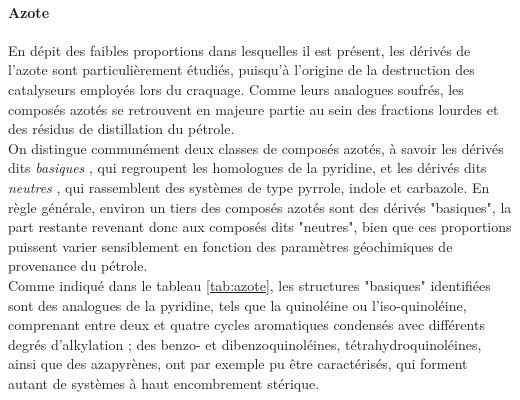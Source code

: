 \documentclass[12pt,a4paper]{book}
\begin{document}
\paragraph{Azote}
En dépit des faibles proportions dans lesquelles il est présent, les dérivés de l'azote sont particulièrement étudiés, puisqu'à l'origine de la destruction des catalyseurs employés lors du craquage. Comme leurs analogues soufrés, les composés azotés se retrouvent en majeure partie au sein des fractions lourdes et des résidus de distillation du pétrole. \\
On distingue communément deux classes de composés azotés, à savoir les dérivés dits \og \textit{basiques} \fg, qui regroupent les homologues de la pyridine, et les dérivés dits \og \textit{neutres} \fg, qui rassemblent des systèmes de type pyrrole, indole et carbazole.  
En règle générale, environ un tiers des composés azotés sont des dérivés "basiques", la part restante revenant donc aux composés dits "neutres", bien que ces proportions puissent varier sensiblement en fonction des paramètres géochimiques de provenance du pétrole. \\
Comme indiqué dans le tableau \ref{tab:azote}, les structures "basiques" identifiées sont des analogues de la pyridine, tels que la quinoléine ou l'iso-quinoléine, comprenant entre deux et quatre cycles aromatiques condensés avec différents degrés d'alkylation ; des benzo- et dibenzoquinoléines, tétrahydroquinoléines, ainsi que des azapyrènes, ont par exemple pu être caractérisés, qui forment autant de systèmes à haut encombrement stérique. \\
\end{document}
